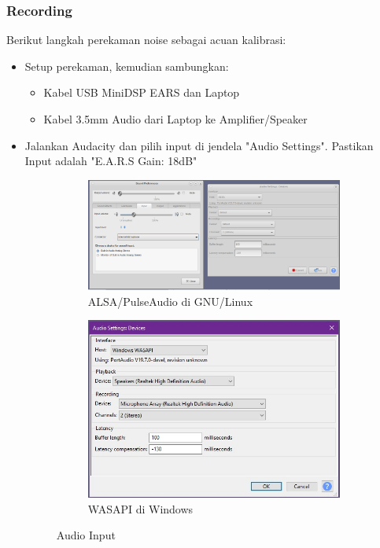 \documentclass{article}
\begin{document}
	\subsubsection{Recording}

	Berikut langkah perekaman noise sebagai acuan kalibrasi:

	\begin{itemize}
		\item Setup perekaman, kemudian sambungkan:
		\begin{itemize}
			\item Kabel USB MiniDSP EARS dan Laptop
			\item Kabel 3.5mm Audio dari Laptop ke Amplifier/Speaker
		\end{itemize}
	
		\item Jalankan Audacity dan pilih input di jendela "Audio Settings".
		Pastikan Input adalah "E.A.R.S Gain: 18dB"
		
		\begin{figure}[H]
			\centering
			\begin{subfigure}[]{.55\textwidth}
				\includegraphics[width=\textwidth]{images/audacity_in_linux}
				\caption{ALSA/PulseAudio di GNU/Linux}
			\end{subfigure}
			\begin{subfigure}[]{.35\textwidth}
				\includegraphics[width=\textwidth]{images/audacity_in_windows}
				\caption{WASAPI di Windows}
			\end{subfigure}
			\caption{Audio Input}
		\end{figure}
		

\end{itemize}
\end{document}
